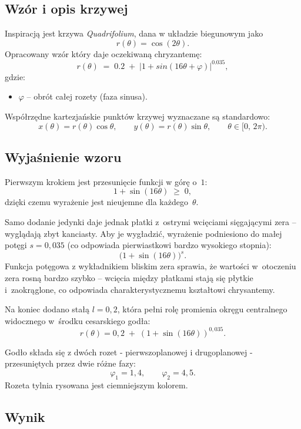 \documentclass[12pt,a4paper]{article}
\begin{document}
	\subsection*{Wzór i opis krzywej}
	
	Inspiracją jest krzywa \emph{Quadrifolium}, dana w układzie biegunowym jako
	\[
	r(\theta) = \cos(2\theta).
	\]
	Opracowany wzór który daje oczekiwaną chryzantemę:
	\[
	\boxed{r(\theta) \;=\; 0.2 \;+\; \bigl|1 +sin(16\theta + \varphi)\bigr|^{0.035},}
	\]
	gdzie:
	\begin{itemize}
		\item $\varphi$ -- obrót całej rozety (faza sinusa).
	\end{itemize}
	
	Współrzędne kartezjańskie punktów krzywej wyznaczane są standardowo:
	\[
	x(\theta) = r(\theta)\cos\theta, \qquad y(\theta) = r(\theta)\sin\theta, \qquad \theta \in [0,\, 2\pi).
	\]
	
	\subsection{Wyjaśnienie wzoru}
Pierwszym krokiem jest  przesunięcie funkcji w górę o~$1$:
\[
1 + \sin(16\theta) \;\geq\; 0,
\]
dzięki czemu wyrażenie jest nieujemne dla każdego~$\theta$.

Samo dodanie jedynki daje jednak płatki z~ostrymi wcięciami
sięgającymi zera -- wyglądają zbyt kanciasty. Aby je wygładzić,
wyrażenie podniesiono do małej potęgi $s = 0{,}035$
(co odpowiada pierwiastkowi bardzo wysokiego stopnia):
\[
\bigl(1 + \sin(16\theta)\bigr)^{s}.
\]
Funkcja potęgowa z wykładnikiem bliskim zera sprawia,
że wartości w~otoczeniu zera rosną bardzo szybko --
wcięcia między płatkami stają się płytkie i~zaokrąglone,
co odpowiada charakterystycznemu kształtowi chrysantemy.

Na koniec dodano stałą $l = 0{,}2$, która pełni rolę
promienia okręgu centralnego widocznego w~środku cesarskiego godła:
\[
r(\theta) = 0{,}2 \;+\; (1 + \sin(16\theta))^{0{,}035}.
\]
\newline

Godło składa się z dwóch rozet - pierwszoplanowej i drugoplanowej - przesuniętych przez dwie różne fazy:
\[
\varphi_1 = 1{,}4, \qquad \varphi_2 = 4{,}5.
\]
Rozeta tylnia rysowana jest ciemniejszym kolorem.
	
	\subsection*{Wynik}
	
\end{document}
